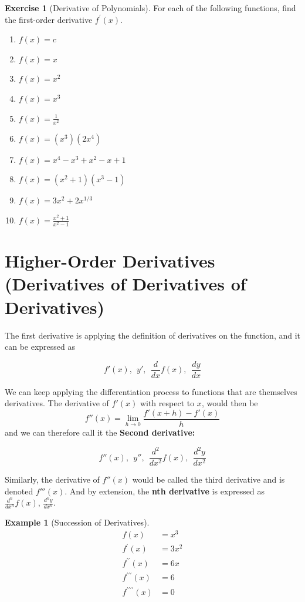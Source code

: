 \documentclass[
]{book}
\providecommand{\tightlist}{%
  \setlength{\itemsep}{0pt}\setlength{\parskip}{0pt}}
\theoremstyle{definition}
\theoremstyle{definition}
\newtheorem{example}{Example}[chapter]
\theoremstyle{definition}
\newtheorem{exercise}{Exercise}[chapter]
\theoremstyle{remark}
\begin{document}
\begin{exercise}[Derivative of Polynomials]
\protect\hypertarget{exr:introderivatives}{}{\label{exr:introderivatives} {} }
For each of the following functions, find the first-order derivative \(f^\prime(x)\).

\begin{enumerate}
\def\labelenumi{\arabic{enumi}.}
\tightlist
\item
  \(f(x)=c\)
\item
  \(f(x)=x\)
\item
  \(f(x)=x^2\)
\item
  \(f(x)=x^3\)
\item
  \(f(x)=\frac{1}{x^2}\)
\item
  \(f(x)=(x^3)(2x^4)\)
\item
  \(f(x) = x^4 - x^3 + x^2 - x + 1\)
\item
  \(f(x) = (x^2 + 1)(x^3 - 1)\)
\item
  \(f(x) = 3x^2 + 2x^{1/3}\)
\item
  \(f(x)=\frac{x^2+1}{x^2-1}\)
\end{enumerate}
\end{exercise}

\hypertarget{derivpoly}{%
\section{Higher-Order Derivatives (Derivatives of Derivatives of Derivatives)}\label{derivpoly}}

The first derivative is applying the definition of derivatives on the function, and it can be expressed as

\[f'(x),  ~~ y',  ~~ \frac{d}{dx}f(x), ~~ \frac{dy}{dx}\]

We can keep applying the differentiation process to functions that are themselves derivatives. The derivative of \(f'(x)\) with respect to \(x\), would then be \[f''(x)=\lim\limits_{h\to 0}\frac{f'(x+h)-f'(x)}{h}\] and we can therefore call it the \textbf{Second derivative:}

\[f''(x), ~~ y'', ~~ \frac{d^2}{dx^2}f(x), ~~ \frac{d^2y}{dx^2}\]

Similarly, the derivative of \(f''(x)\) would be called the third derivative and is denoted \(f'''(x)\). And by extension, the \textbf{nth derivative} is expressed as \(\frac{d^n}{dx^n}f(x)\), \(\frac{d^ny}{dx^n}\).

\begin{example}[Succession of Derivatives]
\protect\hypertarget{exm:unnamed-chunk-16}{}{\label{exm:unnamed-chunk-16} {} }\begin{align*}
f(x) &=x^3\\
f^{\prime}(x) &=3x^2\\
f^{\prime\prime}(x) &=6x \\
f^{\prime\prime\prime}(x) &=6\\
f^{\prime\prime\prime\prime}(x) &=0\\
\end{align*}
\end{example}
\end{document}
